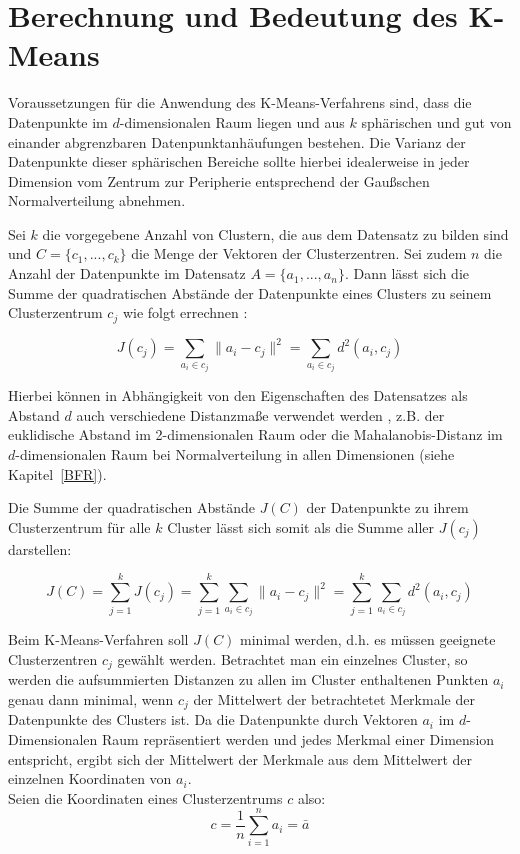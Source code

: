 \documentclass[a4paper,12pt,twoside]{article}
\begin{document}
\section{Berechnung und Bedeutung des K-Means}

Voraussetzungen für die Anwendung des K-Means-Verfahrens sind, dass die Datenpunkte im $ d $-dimensionalen Raum liegen und aus $ k $ sphärischen und gut von einander abgrenzbaren Datenpunktanhäufungen bestehen. Die Varianz der Datenpunkte dieser sphärischen Bereiche sollte hierbei idealerweise in jeder Dimension vom Zentrum zur Peripherie entsprechend der Gaußschen Normalverteilung abnehmen.
\\

\par 
Sei $k$ die vorgegebene Anzahl von Clustern, die aus dem Datensatz zu bilden sind und $C = \{c_{1}, ... , c_{k}\}$ die Menge der Vektoren der Clusterzentren. Sei zudem $n$ die Anzahl der Datenpunkte im Datensatz $A = \{a_{1}, ... , a_{n}\}$. Dann lässt sich die Summe der quadratischen Abstände der Datenpunkte eines Clusters zu seinem Clusterzentrum $c_{j}$ wie folgt errechnen \citep{jain2010}:

\[ J(c_{j}) = \sum_{a_{i}\in c_{j}}\|a_{i} - c_{j}\|^2 = \sum_{a_{i}\in c_{j}}d^2(a_{i},c_{j}) \]

\par
Hierbei können in Abhängigkeit von den Eigenschaften des Datensatzes als Abstand $d$ auch verschiedene Distanzmaße verwendet werden \citep{Moris2013}, z.B. der euklidische Abstand im 2-dimensionalen Raum oder die Mahalanobis-Distanz im $d$-dimensionalen Raum bei Normalverteilung in allen Dimensionen (siehe Kapitel~\ref{BFR}).
\\
\par
Die Summe der quadratischen Abstände  $J(C)$ der Datenpunkte zu ihrem Clusterzentrum für alle $k$ Cluster lässt sich somit als die Summe aller $J(c_{j})$ darstellen:
 
\[ J(C) = \sum_{j = 1}^k J(c_{j}) = \sum_{j = 1}^k\sum_{a_{i}\in c_{j}}\|a_{i} - c_{j}\|^2 = \sum_{j = 1}^k\sum_{a_{i}\in c_{j}}d^2(a_{i},c_{j}) \]


\par
Beim K-Means-Verfahren soll $J(C)$ minimal werden, d.h. es müssen geeignete Clusterzentren $c_{j}$ gewählt werden. Betrachtet man ein einzelnes Cluster, so werden die aufsummierten Distanzen zu allen im Cluster enthaltenen Punkten $a_{i}$ genau dann minimal, wenn $ c_{j} $ der Mittelwert der betrachtetet Merkmale der Datenpunkte des Clusters ist. Da die Datenpunkte durch Vektoren $a_{i}$ im $ d $-Dimensionalen Raum repräsentiert werden und jedes Merkmal einer Dimension entspricht, ergibt sich der Mittelwert der Merkmale aus dem Mittelwert der einzelnen Koordinaten von $a_{i}$. \\
\newpage
\noindent
Seien die Koordinaten eines Clusterzentrums $ c $ also:
\[c = \frac{1}{n}\sum_{i = 1}^n a_{i} = \bar a\]
\end{document}
